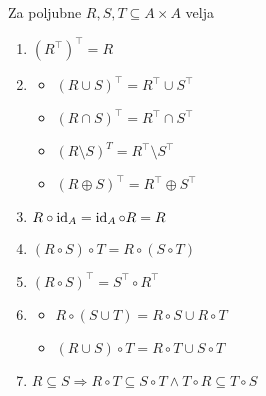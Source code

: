\documentclass[12pt, a4paper]{article}
\renewcommand{\implies}{\Rightarrow}
\begin{document}
\begin{izrek}
Za poljubne $R,S,T\subseteq A\times A$ velja

\begin{enumerate}
\item $(R^\top)^\top=R$
\item

\vspace{-6pt}
\begin{multicols}{2}
\begin{itemize}
\item$(R\cup S)^\top=R^\top\cup S^\top$
\item $(R\cap S)^\top=R^\top\cap S^\top$
\item $(R\setminus S)^T=R^\top\setminus S^\top$
\item $(R\oplus S)^\top=R^\top\oplus S^\top$
\end{itemize}
\end{multicols}
\vspace{-12pt}

\item $R\circ\operatorname{id}_A=\operatorname{id}_A\circ R=R$
\item $(R\circ S)\circ T=R\circ(S\circ T)$
\item $(R\circ S)^\top=S^\top\circ R^\top$
\item

\vspace{-6pt}
\begin{multicols}{2}
\begin{itemize}
\item $R\circ(S\cup T)=R\circ S\cup R\circ T$
\item $(R\cup S)\circ T=R\circ T\cup S\circ T$
\end{itemize}
\end{multicols}
\vspace{-12pt}

\item $R\subseteq S\implies R\circ T\subseteq S\circ T\land T\circ R\subseteq T\circ S$
\end{enumerate}
\end{izrek}

\obvs
\end{document}
